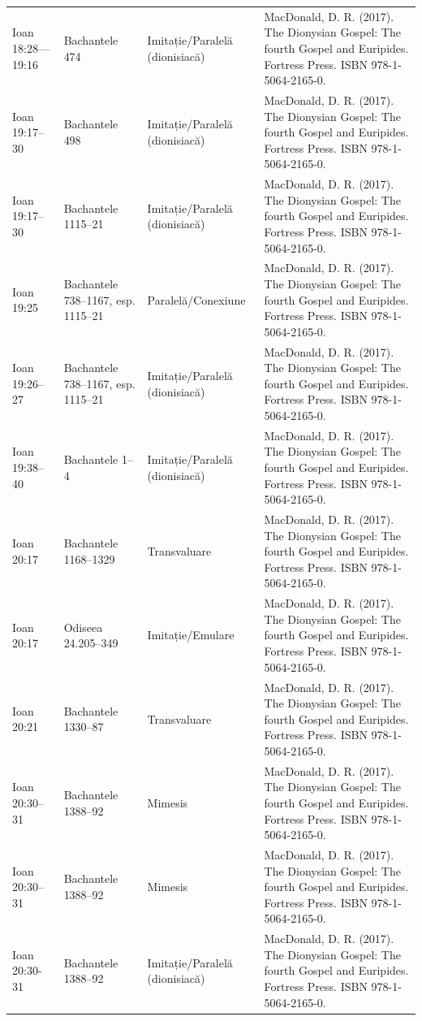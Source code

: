 \documentclass[12pt,a4paper,twoside,openany]{book}
\begin{document}
\begin{longtable}{L{1.4cm}L{1.7cm}L{3.1cm}L{8.4cm}}
Ioan 18:28—19:16 & Bachantele 474 & Imitație/Paralelă (dionisiacă) & MacDonald, D. R. (2017). The Dionysian Gospel: The fourth Gospel and Euripides. Fortress Press. ISBN 978-1-5064-2165-0. \\
Ioan 19:17–30 & Bachantele 498 & Imitație/Paralelă (dionisiacă) & MacDonald, D. R. (2017). The Dionysian Gospel: The fourth Gospel and Euripides. Fortress Press. ISBN 978-1-5064-2165-0. \\
Ioan 19:17–30 & Bachantele 1115–21 & Imitație/Paralelă (dionisiacă) & MacDonald, D. R. (2017). The Dionysian Gospel: The fourth Gospel and Euripides. Fortress Press. ISBN 978-1-5064-2165-0. \\
Ioan 19:25 & Bachantele 738–1167, esp. 1115–21 & Paralelă/Conexiune & MacDonald, D. R. (2017). The Dionysian Gospel: The fourth Gospel and Euripides. Fortress Press. ISBN 978-1-5064-2165-0. \\
Ioan 19:26–27 & Bachantele 738–1167, esp. 1115–21 & Imitație/Paralelă (dionisiacă) & MacDonald, D. R. (2017). The Dionysian Gospel: The fourth Gospel and Euripides. Fortress Press. ISBN 978-1-5064-2165-0. \\
Ioan 19:38–40 & Bachantele 1–4 & Imitație/Paralelă (dionisiacă) & MacDonald, D. R. (2017). The Dionysian Gospel: The fourth Gospel and Euripides. Fortress Press. ISBN 978-1-5064-2165-0. \\
Ioan 20:17 & Bachantele 1168–1329 & Transvaluare & MacDonald, D. R. (2017). The Dionysian Gospel: The fourth Gospel and Euripides. Fortress Press. ISBN 978-1-5064-2165-0. \\
Ioan 20:17 & Odiseea 24.205–349 & Imitație/Emulare & MacDonald, D. R. (2017). The Dionysian Gospel: The fourth Gospel and Euripides. Fortress Press. ISBN 978-1-5064-2165-0. \\
Ioan 20:21 & Bachantele 1330–87 & Transvaluare & MacDonald, D. R. (2017). The Dionysian Gospel: The fourth Gospel and Euripides. Fortress Press. ISBN 978-1-5064-2165-0. \\
Ioan 20:30–31 & Bachantele 1388–92 & Mimesis & MacDonald, D. R. (2017). The Dionysian Gospel: The fourth Gospel and Euripides. Fortress Press. ISBN 978-1-5064-2165-0. \\
Ioan 20:30–31 & Bachantele 1388–92 & Mimesis & MacDonald, D. R. (2017). The Dionysian Gospel: The fourth Gospel and Euripides. Fortress Press. ISBN 978-1-5064-2165-0. \\
Ioan 20:30-31 & Bachantele 1388–92 & Imitație/Paralelă (dionisiacă) & MacDonald, D. R. (2017). The Dionysian Gospel: The fourth Gospel and Euripides. Fortress Press. ISBN 978-1-5064-2165-0. \\

\end{longtable}
\end{document}
